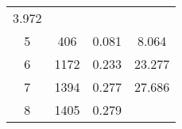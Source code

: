 \documentclass[]{book}
\theoremstyle{definition}
\theoremstyle{definition}
\theoremstyle{definition}
\theoremstyle{remark}
\begin{document}
\begin{longtable}[]{@{}cccc@{}}
\begin{minipage}[t]{0.15\columnwidth}
3.972\strut
\end{minipage}\tabularnewline
\begin{minipage}[t]{0.20\columnwidth}\centering\strut
5\strut
\end{minipage} & \begin{minipage}[t]{0.25\columnwidth}\centering\strut
406\strut
\end{minipage} & \begin{minipage}[t]{0.25\columnwidth}\centering\strut
0.081\strut
\end{minipage} & \begin{minipage}[t]{0.15\columnwidth}\centering\strut
8.064\strut
\end{minipage}\tabularnewline
\begin{minipage}[t]{0.20\columnwidth}\centering\strut
6\strut
\end{minipage} & \begin{minipage}[t]{0.25\columnwidth}\centering\strut
1172\strut
\end{minipage} & \begin{minipage}[t]{0.25\columnwidth}\centering\strut
0.233\strut
\end{minipage} & \begin{minipage}[t]{0.15\columnwidth}\centering\strut
23.277\strut
\end{minipage}\tabularnewline
\begin{minipage}[t]{0.20\columnwidth}\centering\strut
7\strut
\end{minipage} & \begin{minipage}[t]{0.25\columnwidth}\centering\strut
1394\strut
\end{minipage} & \begin{minipage}[t]{0.25\columnwidth}\centering\strut
0.277\strut
\end{minipage} & \begin{minipage}[t]{0.15\columnwidth}\centering\strut
27.686\strut
\end{minipage}\tabularnewline
\begin{minipage}[t]{0.20\columnwidth}\centering\strut
8\strut
\end{minipage} & \begin{minipage}[t]{0.25\columnwidth}\centering\strut
1405\strut
\end{minipage} & \begin{minipage}[t]{0.25\columnwidth}\centering\strut
0.279\strut
\end{minipage} & \begin{minipage}[t]{0.15\columnwidth}\centering\strut

\end{minipage}
\end{longtable}
\end{document}
